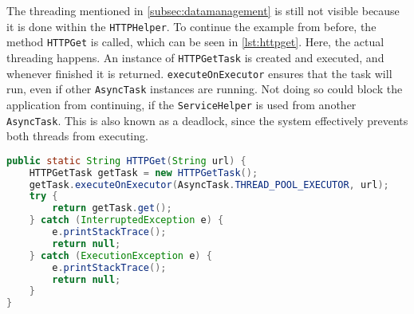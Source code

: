 The threading mentioned in \ref{subsec:datamanagement} is still not visible because it is done within the \texttt{HTTPHelper}. To continue the example from before, the method \texttt{HTTPGet} is called, which can be seen in \ref{lst:httpget}. Here, the actual threading happens. An instance of \texttt{HTTPGetTask} is created and executed, and whenever finished it is returned. \texttt{executeOnExecutor} ensures that the task will run, even if other \texttt{AsyncTask} instances are running. Not doing so could block the application from continuing, if the \texttt{ServiceHelper} is used from another \texttt{AsyncTask}. This is also known as a deadlock, since the system effectively prevents both threads from executing.

\begin{lstlisting}[language=java, label={lst:httpget}, caption={Starting a thread for HTTPGet}]
public static String HTTPGet(String url) {
	HTTPGetTask getTask = new HTTPGetTask();
   	getTask.executeOnExecutor(AsyncTask.THREAD_POOL_EXECUTOR, url);
    try {
    	return getTask.get();
    } catch (InterruptedException e) {
        e.printStackTrace();
    	return null;
    } catch (ExecutionException e) {
        e.printStackTrace();
        return null;
    }
}
\end{lstlisting}